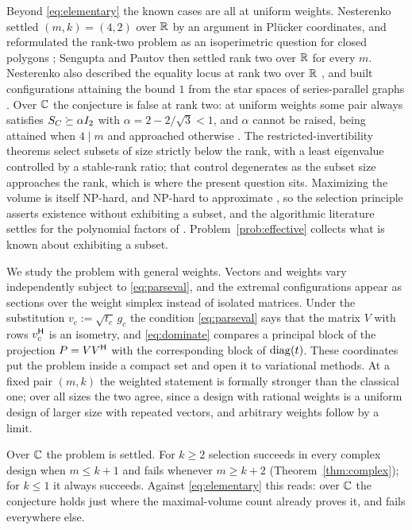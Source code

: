 Beyond \eqref{eq:elementary} the known cases are all at uniform weights.
Nesterenko \cite{Nesterenko2023} settled $(m,k)=(4,2)$ over $\mathbb{R}$ by an
argument in Pl\"ucker coordinates, and reformulated the rank-two problem
as an isoperimetric question for closed polygons
\cite{Nesterenko2024}; Sengupta and Pautov \cite{SenguptaPautov2026} then
settled rank two over $\mathbb{R}$ for every $m$.  Nesterenko also described the
equality locus at rank two over $\mathbb{R}$ \cite{Nesterenko2026real}, and built
configurations attaining the bound $1$ from the star spaces of
series-parallel graphs \cite{Nesterenko2025}.  Over $\mathbb{C}$ the conjecture is
false at rank two: at uniform weights some pair always satisfies
$S_{C}\succeq\alpha I_2$ with $\alpha=2-2/\sqrt3<1$, and $\alpha$ cannot be
raised, being attained when $4\mid m$ and approached otherwise
\cite{Nesterenko2026complex}.  The restricted-invertibility theorems
\cite{BourgainTzafriri1987,SpielmanSrivastava2012,MSS2022} select subsets
of size strictly below the rank, with a least eigenvalue controlled by a
stable-rank ratio; that control degenerates as the subset size approaches
the rank, which is where the present question sits.  Maximizing the
volume is itself NP-hard, and NP-hard to approximate
\cite{CivrilMagdonIsmail2009}, so the selection principle asserts
existence without exhibiting a subset, and the algorithmic literature
settles for the polynomial factors of \cite{GuEisenstat1996}.
Problem~\ref{prob:effective} collects what is known about exhibiting a
subset.

\medskip

We study the problem with general weights.  Vectors and weights vary
independently subject to \eqref{eq:parseval}, and the extremal
configurations appear as sections over the weight simplex instead of
isolated matrices.  Under the substitution $v_c:=\sqrt{t_c}\,g_c$ the
condition \eqref{eq:parseval} says that the matrix $V$ with rows
$v_c^{\mathsf{H}}$ is an isometry, and \eqref{eq:dominate} compares a principal
block of the projection $P=VV^{\mathsf{H}}$ with the corresponding block of
$\operatorname{diag}(t)$.  These coordinates put the problem inside a compact set and
open it to variational methods.  At a fixed pair $(m,k)$ the weighted
statement is formally stronger than the classical one; over all sizes the
two agree, since a design with rational weights is a uniform design of
larger size with repeated vectors, and arbitrary weights follow by a
limit.

\medskip

Over $\mathbb{C}$ the problem is settled.  For $k\ge2$ selection succeeds in every
complex design when $m\le k+1$ and fails whenever $m\ge k+2$
(Theorem~\ref{thm:complex}); for $k\le1$ it always succeeds.  Against
\eqref{eq:elementary} this reads: over $\mathbb{C}$ the conjecture holds just
where the maximal-volume count already proves it, and fails everywhere
else.

